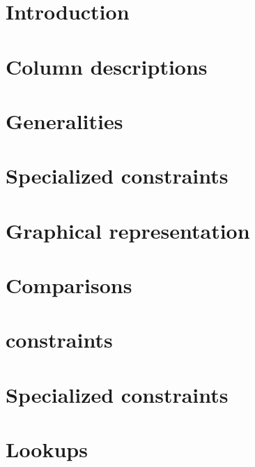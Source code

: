 
\section{Introduction}                   \label{rlp auth: intro}                           
\section{Column descriptions}            \label{rlp auth: column descriptions}             
\section{Generalities}                   \label{rlp auth: generalities}                    
\section{Specialized constraints}        \label{rlp auth: specialized constraints}         
\section{Graphical representation}       \label{rlp auth: graphical representation}        
\section{Comparisons}                    \label{rlp auth: comparisons}                     
\section{\rlpUtilsMod{} constraints}     \label{rlp auth: rlp utils}                       
\section{Specialized constraints}        \label{rlp auth: specialized}                     
\section{Lookups}                        \label{rlp auth: lookups}                         
